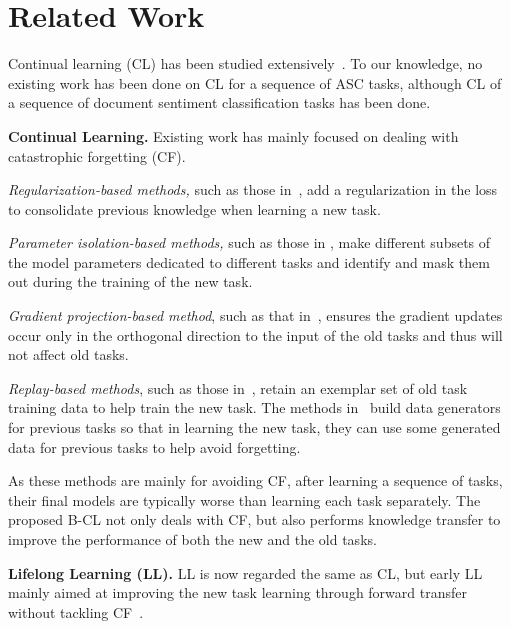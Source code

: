 \documentclass[11pt]{article}
\begin{document}
\section{Related Work}
\label{sec.related.work}


Continual learning (CL) has been studied extensively~\cite{chen2018lifelong,Parisi2019continual}. To our knowledge, no existing work has been done on CL for a sequence of ASC tasks, although CL of a sequence of document sentiment classification tasks has been done. 

\vspace{1mm}
\noindent
\textbf{Continual Learning.}
Existing work has mainly focused on dealing with catastrophic forgetting (CF). 






\textit{Regularization-based methods,} such as those in~\cite{Kirkpatrick2017overcoming,DBLP:conf/nips/LeeKJHZ17,Seff2017continual}, add a regularization in the loss to consolidate previous knowledge when learning a new task. 

\textit{Parameter isolation-based methods,} such as those in \cite{Serra2018overcoming,Mallya2017packnet,fernando2017pathnet}, make different subsets of the model parameters dedicated to different tasks and identify and mask them out during the training of the new task.

\textit{Gradient projection-based method}, such as that in~\cite{zeng2019continuous}, ensures the gradient updates occur only in the orthogonal direction to the input of the old tasks and thus will not affect old tasks. 

\textit{Replay-based methods}, such as those in~\cite{Rebuffi2017,Lopez2017gradient,Chaudhry2019ICLR}, retain an exemplar set of old task training data to help train the new task. The methods in~\cite{Shin2017continual,Kamra2017deep,Rostami2019ijcai,He2018overcoming} build data generators for previous tasks so that in learning the new task, they can use some generated data for previous tasks to help avoid forgetting. 

As these methods are mainly for avoiding CF, after learning a sequence of tasks, their final models are typically worse than learning each task separately. The proposed B-CL not only deals with CF, but also performs knowledge transfer to improve the performance of both the new and the old tasks.

\textbf{Lifelong Learning (LL).} LL is now regarded the same as CL, but early LL mainly aimed at improving the new task learning through forward transfer without tackling CF~\cite{Silver2013,ruvolo2013ella,chen2018lifelong}. 
\end{document}
